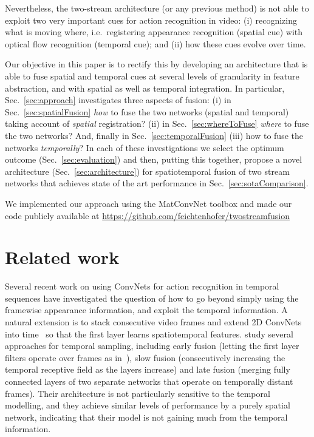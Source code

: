 \documentclass[10pt,twocolumn,letterpaper]{article}
\begin{document}
Nevertheless, the
two-stream architecture (or any previous method) 
is not able to exploit two very important
cues for action recognition in video: 
(i) recognizing what is moving where, i.e.\ registering appearance
recognition (spatial cue) with optical flow recognition (temporal cue);
and (ii) how these cues evolve over time. 

Our objective in this paper is to rectify this by developing an
architecture that is able to fuse spatial and temporal cues at several
levels of granularity in feature abstraction, and with spatial as well
as temporal integration. In particular, Sec.~\ref{sec:approach} investigates three aspects of fusion: (i) in Sec.~\ref{sec:spatialFusion} {\em how} to fuse the two networks (spatial and temporal)
taking account of {\em spatial} registration?  (ii) in Sec.~\ref{sec:whereToFuse}  {\em where} to fuse
the two networks?  And, finally in Sec.~\ref{sec:temporalFusion} (iii) how to fuse the networks {\em temporally}?  In each of these investigations we select the optimum outcome (Sec.~\ref{sec:evaluation}) and then, putting this together, propose a novel architecture (Sec.~\ref{sec:architecture}) for spatiotemporal fusion of two stream networks that achieves  state of the art performance in Sec.~\ref{sec:sotaComparison}.

We implemented our approach using the MatConvNet toolbox \cite{vedaldi15matconvnet} and made our code publicly available at \href{https://github.com/feichtenhofer/twostreamfusion}{https://github.com/feichtenhofer/twostreamfusion}

 	
\section{Related work}
\label{sec:related_work}
Several recent work on using ConvNets for action recognition in temporal
sequences have investigated the question of how to go beyond simply
using the framewise appearance information, and exploit the temporal
information.
A natural extension is to stack consecutive video frames and 
extend 2D ConvNets into time~\cite{JiPAMI13} so that the first layer learns
spatiotemporal features. \cite{Karpathy14} study 
several approaches for temporal sampling, including
early fusion (letting the first layer filters operate over frames as in~\cite{JiPAMI13}), slow fusion (consecutively increasing the temporal receptive field as the layers increase) and late fusion (merging fully connected layers of two separate networks that operate on temporally distant frames).
Their architecture is
not particularly sensitive to the temporal modelling, and 
they achieve similar levels of performance by
a purely spatial network, indicating that their model is not gaining much
from the temporal information.
\end{document}
